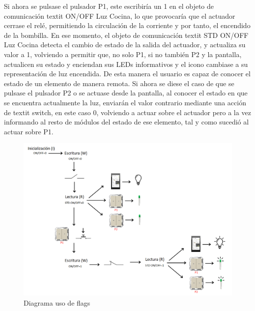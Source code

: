 Si ahora se pulsase el pulsador P1, este escribiría un 1 en el objeto de comunicación textit {ON/OFF Luz Cocina}, lo que provocaría que el actuador cerrase el relé, permitiendo la circulación de la corriente y por tanto, el encendido de la bombilla. En ese momento, el objeto de comunicación textit {STD ON/OFF Luz Cocina} detecta el cambio de estado de la salida del actuador, y actualiza su valor a 1, volviendo a permitir que, no solo P1, si no también P2 y la pantalla, actualicen su estado y enciendan sus LEDs informativos y el icono cambiase a su representación de luz encendida. De esta manera el usuario es capaz de conocer el estado de un elemento de manera remota. Si ahora se diese el caso de que se pulsase el pulsador P2 o se actuase desde la pantalla, al conocer el estado en que se encuentra actualmente la luz, enviarán el valor contrario mediante una acción de textit {switch}, en este caso 0, volviendo a actuar sobre el actuador pero a la vez informando al resto de módulos del estado de ese elemento, tal y como sucedió al actuar sobre P1.
 \begin{center}
\begin{figure}[H]
\includegraphics[width=1.15\textwidth]{figures/diag_flags.png}   
\caption{Diagrama uso de flags}
\label{fig:diag_flags}
\end{figure}
\end{center}
